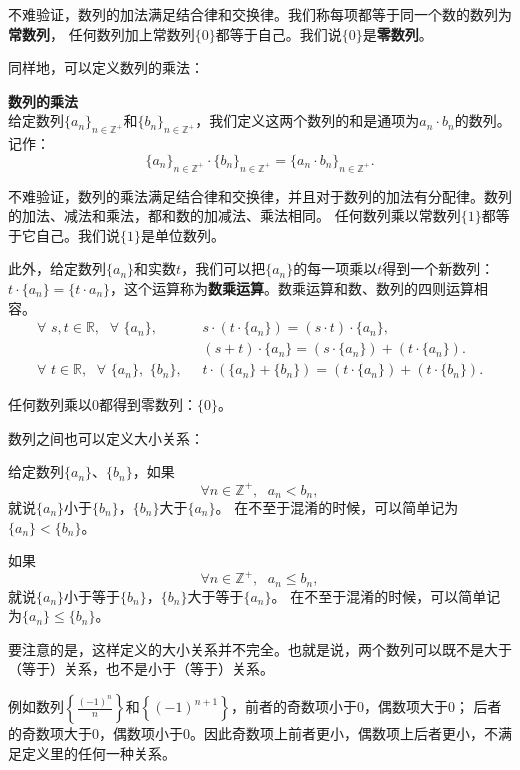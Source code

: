 \documentclass[12pt,UTF8,fontset=none]{ctexbook}
\begin{document}
不难验证，数列的加法满足结合律和交换律。我们称每项都等于同一个数的数列为\textbf{常数列}，
任何数列加上常数列$\{0\}$都等于自己。我们说$\{0\}$是\textbf{零数列}。

同样地，可以定义数列的乘法：
\begin{df}\textbf{数列的乘法}\\
    给定数列$\{a_n\}_{n\in\mathbb{Z}^+}$和$\{b_n\}_{n\in\mathbb{Z}^+}$，我们定义这两个数列的和是通项为$a_n \cdot b_n$的数列。
    记作：
    $$ \{a_n\}_{n\in\mathbb{Z}^+} \cdot \{b_n\}_{n\in\mathbb{Z}^+} = \{a_n \cdot b_n\}_{n\in\mathbb{Z}^+}.$$    
\end{df}

不难验证，数列的乘法满足结合律和交换律，并且对于数列的加法有分配律。数列的加法、减法和乘法，都和数的加减法、乘法相同。
任何数列乘以常数列$\{1\}$都等于它自己。我们说$\{1\}$是单位数列。

此外，给定数列$\{a_n\}$和实数$t$，我们可以把$\{a_n\}$的每一项乘以$t$得到一个新数列：
$t\cdot \{a_n\} = \{t\cdot a_n\}$，这个运算称为\textbf{数乘运算}。数乘运算和数、数列的四则运算相容。
\begin{align*}
    \forall  \,\, s, t \in \mathbb{R}, \;\,\, \forall \,\, \{a_n\}, \;\,\,& s \cdot (t\cdot \{a_n\}) = (s\cdot t)\cdot \{a_n\},  \\
    & (s + t) \cdot \{a_n\} = (s\cdot \{a_n\}) + (t\cdot \{a_n\}).  \\
    \forall  \,\, t \in \mathbb{R}, \;\,\, \forall \,\, \{a_n\}, \,\, \{b_n\},\;\,\, & t \cdot (\{a_n\} + \{b_n\}) = (t \cdot \{a_n\}) + (t \cdot \{b_n\}).  
\end{align*}

任何数列乘以$0$都得到零数列：$\{0\}$。

数列之间也可以定义大小关系：
\begin{df}
    给定数列$\{a_n\}$、$\{b_n\}$，如果
    $$ \forall n\in \mathbb{Z}^+, \;\,\, a_n < b_n,$$
    就说$\{a_n\}$小于$\{b_n\}$，$\{b_n\}$大于$\{a_n\}$。
    在不至于混淆的时候，可以简单记为$\{a_n\} < \{b_n\}$。
    
    如果
    $$ \forall n\in \mathbb{Z}^+, \;\,\, a_n \leqslant b_n,$$
    就说$\{a_n\}$小于等于$\{b_n\}$，$\{b_n\}$大于等于$\{a_n\}$。
    在不至于混淆的时候，可以简单记为$\{a_n\} \leqslant \{b_n\}$。
\end{df}


要注意的是，这样定义的大小关系并不完全。也就是说，两个数列可以既不是大于（等于）关系，也不是小于（等于）关系。

例如数列$\left\{\frac{(-1)^n}{n}\right\}$和$\left\{(-1)^{n+1}\right\}$，前者的奇数项小于$0$，偶数项大于$0$；
后者的奇数项大于$0$，偶数项小于$0$。因此奇数项上前者更小，偶数项上后者更小，不满足定义里的任何一种关系。
\end{document}
